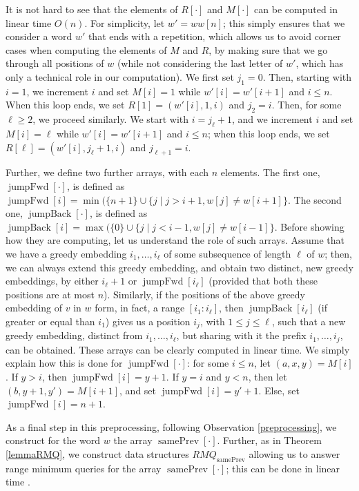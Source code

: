 \documentclass[10pt,a4paper]{amsart}
\makeatletter
\DeclareMathOperator{\prevArray}{samePrev}
\DeclareMathOperator{\jumpAhead}{{jumpFwd}}
\DeclareMathOperator{\jumpBack}{{jumpBack}}
\theoremstyle{plain}
\theoremstyle{definition}
\renewenvironment{proof}[1][\proofname]{\par
  \pushQED{}%
  \normalfont \topsep6\p@\@plus6\p@\relax
  \trivlist
  \item[\hskip\labelsep\itshape #1\@addpunct{.}]\ignorespaces
}{%
  \popQED\endtrivlist\@endpefalse
}
\makeatother
\begin{document}
\begin{proof}
It is not hard to see that the elements of $R[\cdot]$ and $M[\cdot]$ can be computed in linear time $O(n)$. For simplicity, let $w'=ww[n]$; this simply ensures that we consider a word $w'$ that ends with a repetition, which allows us to avoid corner cases when computing the elements of $M$ and $R$, by making sure that we go through all positions of $w$ (while not considering the last letter of $w'$, which has only a technical role in our computation). We first set $j_1=0$. Then, starting with $i=1$, we increment $i$ and set $M[i]=1$ while $w'[i]=w'[i+1]$ and $i\leq n$. When this loop ends, we set $R[1]=(w'[i], 1, i)$ and $j_2=i$. Then, for some $\ell\geq 2$, we proceed similarly. We start with $i=j_{\ell}+1$, and we increment $i$ and set $M[i]=\ell$ while $w'[i]=w'[i+1]$ and $i\leq n$; when this loop ends, we set $R[\ell]=(w'[i], j_{\ell}+1, i)$ and $j_{\ell+1}=i$.  

Further, we define two further arrays, with each $n$ elements. The first one, $\jumpAhead[\cdot]$, is defined as $\jumpAhead[i]=\min(\{n+1\}\cup \{j\mid j>i+1, w[j] \neq w[i+1]\}$. The second one, $\jumpBack[\cdot]$, is defined as $\jumpBack[i]=\max(\{0\}\cup \{j\mid j<i-1, w[j] \neq w[i-1]\}$. Before showing how they are computing, let us understand the role of such arrays. Assume that we have a greedy embedding $i_1,\ldots,i_\ell$ of some subsequence of length $\ell$ of $w$; then, we can always extend this greedy embedding, and obtain two distinct, new greedy embeddings, by either $i_\ell+1$ or $\jumpAhead[i_\ell]$ (provided that both these positions are at most $n$). Similarly, if the positions of the above greedy embedding of $v$ in $w$ form, in fact, a range $[i_1:i_\ell]$, then $\jumpBack[i_\ell]$ (if greater or equal than $i_1$) gives us a position $i_j$, with $1\leq j\leq \ell$, such that a new greedy embedding, distinct from $i_1,\ldots,i_\ell$, but sharing with it the prefix $i_1,\ldots,i_j$, can be obtained. These arrays can be clearly computed in linear time. We simply explain how this is done for $\jumpAhead[\cdot]$: for some $i\leq n$, let $(a,x,y)=M[i]$. If $y>i$, then $\jumpAhead[i]=y+1$. If $y=i$ and $y<n$, then let $(b,y+1,y')=M[i+1]$, and set $\jumpAhead[i]=y'+1$. Else, set $\jumpAhead[i]=n+1$.

As a final step in this preprocessing, following Observation \ref{preprocessing}, we construct for the word $w$ the array $\prevArray[\cdot]$. Further, as in Theorem \ref{lemmaRMQ}, we construct data structures $RMQ_{\prevArray}$ allowing us to answer range minimum queries for the array $\prevArray[\cdot]$; this can be done in linear time \cite{BenderF02}. 


\end{proof}
\end{document}

